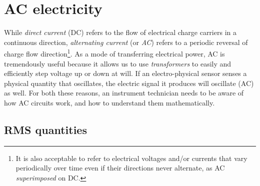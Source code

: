 \chapter{AC electricity}

While \textit{direct current} (DC) refers to the flow of electrical charge carriers in a continuous direction, \textit{alternating current} (or \textit{AC}) refers to a periodic reversal of charge flow direction\footnote{It is also acceptable to refer to electrical voltages and/or currents that vary periodically over time even if their directions never alternate, as AC \textit{superimposed} on DC.}.  As a mode of transferring electrical power, AC is tremendously useful because it allows us to use \textit{transformers} to easily and efficiently step voltage up or down at will.  If an electro-physical sensor senses a physical quantity that oscillates, the electric signal it produces will oscillate (AC) as well.  For both these reasons, an instrument technician needs to be aware of how AC circuits work, and how to understand them mathematically.        































\filbreak
\section{RMS quantities}

